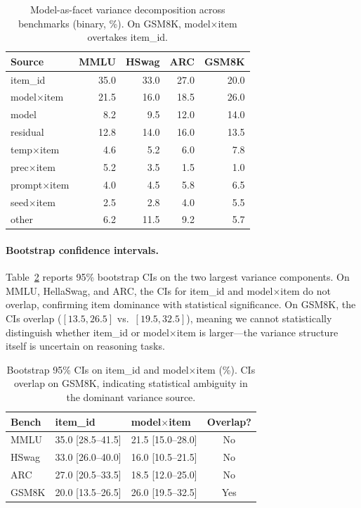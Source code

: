 \documentclass[letterpaper,11pt]{article}
\begin{document}
\begin{table}[t]
\centering
\caption{Model-as-facet variance decomposition across benchmarks (binary, \%). On GSM8K, model$\times$item overtakes item\_id.}
\label{tab:maf}
\small
\begin{tabular}{@{}l rrrr@{}}
\toprule
Source & MMLU & HSwag & ARC & GSM8K \\
\midrule
item\_id           & 35.0 & 33.0 & 27.0 & 20.0 \\
model$\times$item  & 21.5 & 16.0 & 18.5 & 26.0 \\
model              &  8.2 &  9.5 & 12.0 & 14.0 \\
residual           & 12.8 & 14.0 & 16.0 & 13.5 \\
temp$\times$item   &  4.6 &  5.2 &  6.0 &  7.8 \\
prec$\times$item   &  5.2 &  3.5 &  1.5 &  1.0 \\
prompt$\times$item &  4.0 &  4.5 &  5.8 &  6.5 \\
seed$\times$item   &  2.5 &  2.8 &  4.0 &  5.5 \\
other              &  6.2 & 11.5 &  9.2 &  5.7 \\
\bottomrule
\end{tabular}
\end{table}

\paragraph{Bootstrap confidence intervals.}
Table~\ref{tab:ci} reports 95\% bootstrap CIs on the two largest variance components.
On MMLU, HellaSwag, and ARC, the CIs for item\_id and model$\times$item do not overlap, confirming item dominance with statistical significance.
On GSM8K, the CIs overlap ($[13.5, 26.5]$ vs.\ $[19.5, 32.5]$), meaning we cannot statistically distinguish whether item\_id or model$\times$item is larger---the variance structure itself is uncertain on reasoning tasks.

\begin{table}[t]
\centering
\caption{Bootstrap 95\% CIs on item\_id and model$\times$item (\%). CIs overlap on GSM8K, indicating statistical ambiguity in the dominant variance source.}
\label{tab:ci}
\small
\begin{tabular}{@{}l ll c@{}}
\toprule
Bench & item\_id & model$\times$item & Overlap? \\
\midrule
MMLU    & 35.0 [28.5--41.5] & 21.5 [15.0--28.0] & No  \\
HSwag   & 33.0 [26.0--40.0] & 16.0 [10.5--21.5] & No  \\
ARC     & 27.0 [20.5--33.5] & 18.5 [12.0--25.0] & No  \\
GSM8K   & 20.0 [13.5--26.5] & 26.0 [19.5--32.5] & Yes \\
\bottomrule
\end{tabular}
\end{table}
\end{document}
